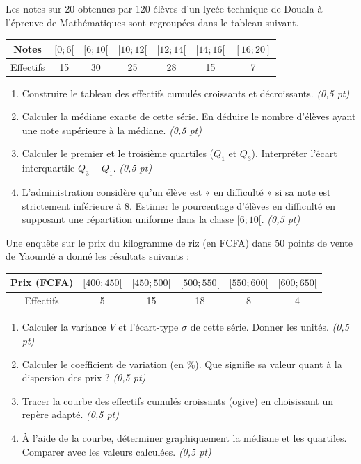 \documentclass[11pt]{article}
\begin{document}
\begin{exercice}
Les notes sur 20 obtenues par 120 élèves d'un lycée technique de Douala à l'épreuve de Mathématiques sont regroupées dans le tableau suivant.
\begin{center}
\begin{tabular}{|c|c|c|c|c|c|c|}
\hline
Notes & $[0; 6[$ & $[6; 10[$ & $[10; 12[$ & $[12; 14[$ & $[14; 16[$ & $[16; 20]$ \\ \hline
Effectifs & 15 & 30 & 25 & 28 & 15 & 7 \\ \hline
\end{tabular}
\end{center}
\begin{enumerate}
    \item Construire le tableau des effectifs cumulés croissants et décroissants. \textit{(0,5 pt)}
    \item Calculer la médiane exacte de cette série. En déduire le nombre d'élèves ayant une note supérieure à la médiane. \textit{(0,5 pt)}
    \item Calculer le premier et le troisième quartiles ($Q_1$ et $Q_3$). Interpréter l'écart interquartile $Q_3 - Q_1$. \textit{(0,5 pt)}
    \item L'administration considère qu'un élève est « en difficulté » si sa note est strictement inférieure à 8. Estimer le pourcentage d'élèves en difficulté en supposant une répartition uniforme dans la classe $[6; 10[$. \textit{(0,5 pt)}
\end{enumerate}
\end{exercice}

\begin{exercice}
Une enquête sur le prix du kilogramme de riz (en FCFA) dans 50 points de vente de Yaoundé a donné les résultats suivants :
\begin{center}
\begin{tabular}{|c|c|c|c|c|c|}
\hline
Prix (FCFA) & $[400; 450[$ & $[450; 500[$ & $[500; 550[$ & $[550; 600[$ & $[600; 650[$ \\ \hline
Effectifs & 5 & 15 & 18 & 8 & 4 \\ \hline
\end{tabular}
\end{center}
\begin{enumerate}
    \item Calculer la variance $V$ et l'écart-type $\sigma$ de cette série. Donner les unités. \textit{(0,5 pt)}
    \item Calculer le coefficient de variation (en \%). Que signifie sa valeur quant à la dispersion des prix ? \textit{(0,5 pt)}
    \item Tracer la courbe des effectifs cumulés croissants (ogive) en choisissant un repère adapté. \textit{(0,5 pt)}
    \item À l'aide de la courbe, déterminer graphiquement la médiane et les quartiles. Comparer avec les valeurs calculées. \textit{(0,5 pt)}
\end{enumerate}
\end{exercice}
\end{document}
